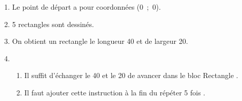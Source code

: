 \begin{enumerate}
\item %

Le point de départ a pour coordonnées (0~;~0).
\item %
5 rectangles sont dessinés.
\item %
On obtient un rectangle le longueur 40 et de largeur 20.
\item 
	\begin{enumerate}
		\item %

Il suffit d'échanger le 40 et le 20 de \og avancer\fg{} dans le bloc \og Rectangle \fg{}.
		\item %
		
Il faut ajouter cette instruction à la fin du \og répéter 5 fois \fg.
	\end{enumerate}
\end{enumerate}

\vspace{0.5cm}

